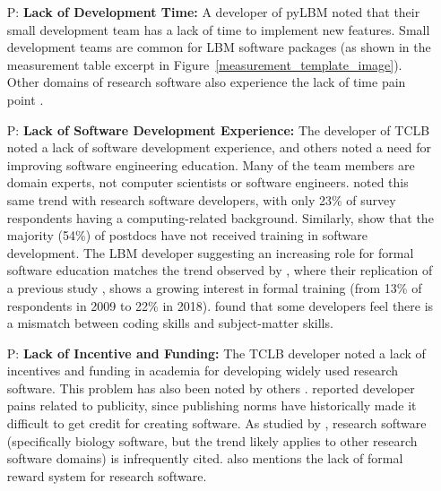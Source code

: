 \documentclass[final, 3p, times, authoryear]{elsarticle}
\newcounter{pnum} %
\begin{document}
\begin{enumerate}

	\item[P\refstepcounter{pnum}\thepnum \label{P_LackDevTime}:] \textbf{Lack of
	Development Time:} A developer of pyLBM noted that their small development
	team has a lack of time to implement new features. Small development teams
	are common for LBM software packages (as shown in the measurement table
	excerpt in Figure~\ref{measurement_template_image}). Other domains of
	research software also experience the lack of time pain point
	\citep{PintoEtAl2018, PintoEtAl2016, WieseEtAl2019}.

	\item[P\refstepcounter{pnum}\thepnum \label{P_LackSoftDevExp}:] \textbf{Lack
	of Software Development Experience:} The developer of TCLB noted a lack of
	software development experience, and others noted a need for improving
	software engineering education. Many of the team members are domain experts,
	not computer scientists or software engineers. \citet{Nguyen-HoanEtAl2010}
	noted this same trend with research software developers, with only 23\% of
	survey respondents having a computing-related background. Similarly,
	\citet{UditAndKatz2017} show that the majority (54\%) of postdocs have not
	received training in software development.  The LBM developer suggesting an
	increasing role for formal software education matches the trend observed by
	\citet{PintoEtAl2018}, where their replication of a previous study
	\citep{HannayEtAl2009}, shows a growing interest in formal training (from
	13\% of respondents in 2009 to 22\% in 2018). \citet{PintoEtAl2018} found
	that some developers feel there is a mismatch between coding skills and
	subject-matter skills. 
	
	\item[P\refstepcounter{pnum}\thepnum \label{P_LackFunding}:] \textbf{Lack of
	Incentive and Funding:} The TCLB developer noted a lack of incentives and
	funding in academia for developing widely used research software. This
	problem has also been noted by others \citep{gewaltig2012quality, Goble2014,
	KaterbowAndFeulner2018}.  \citet{WieseEtAl2019} reported developer pains
	related to publicity, since publishing norms have historically made it
	difficult to get credit for creating software.  As studied by
	\citet{HowisonAndBullard2016}, research software (specifically biology
	software, but the trend likely applies to other research software domains)
	is infrequently cited.  \citet{PintoEtAl2018} also mentions the lack of
	formal reward system for research software.


\end{enumerate}
\end{document}
